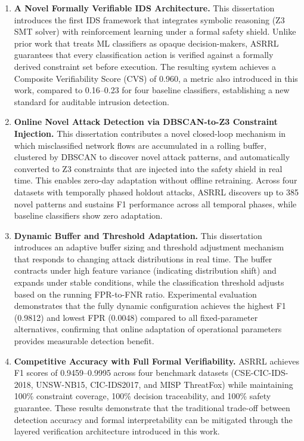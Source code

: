 \documentclass[12pt, letterpaper, oneside]{report}
\newcommand{\ASRRL}{\textsc{ASRRL}}
\begin{document}
\begin{enumerate}
    \item \textbf{A Novel Formally Verifiable IDS Architecture.} This dissertation introduces the first IDS framework that integrates symbolic reasoning (Z3 SMT solver) with reinforcement learning under a formal safety shield. Unlike prior work that treats ML classifiers as opaque decision-makers, \ASRRL{} guarantees that every classification action is verified against a formally derived constraint set before execution. The resulting system achieves a Composite Verifiability Score (CVS) of 0.960, a metric also introduced in this work, compared to 0.16--0.23 for four baseline classifiers, establishing a new standard for auditable intrusion detection.

    \item \textbf{Online Novel Attack Detection via DBSCAN-to-Z3 Constraint Injection.} This dissertation contributes a novel closed-loop mechanism in which misclassified network flows are accumulated in a rolling buffer, clustered by DBSCAN to discover novel attack patterns, and automatically converted to Z3 constraints that are injected into the safety shield in real time. This enables zero-day adaptation without offline retraining. Across four datasets with temporally phased holdout attacks, \ASRRL{} discovers up to 385 novel patterns and sustains F1 performance across all temporal phases, while baseline classifiers show zero adaptation.

    \item \textbf{Dynamic Buffer and Threshold Adaptation.} This dissertation introduces an adaptive buffer sizing and threshold adjustment mechanism that responds to changing attack distributions in real time. The buffer contracts under high feature variance (indicating distribution shift) and expands under stable conditions, while the classification threshold adjusts based on the running FPR-to-FNR ratio. Experimental evaluation demonstrates that the fully dynamic configuration achieves the highest F1 (0.9812) and lowest FPR (0.0048) compared to all fixed-parameter alternatives, confirming that online adaptation of operational parameters provides measurable detection benefit.

    \item \textbf{Competitive Accuracy with Full Formal Verifiability.} \ASRRL{} achieves F1 scores of 0.9459--0.9995 across four benchmark datasets (CSE-CIC-IDS-2018, UNSW-NB15, CIC-IDS2017, and MISP ThreatFox) while maintaining 100\% constraint coverage, 100\% decision traceability, and 100\% safety guarantee. These results demonstrate that the traditional trade-off between detection accuracy and formal interpretability can be mitigated through the layered verification architecture introduced in this work.


\end{enumerate}
\end{document}
